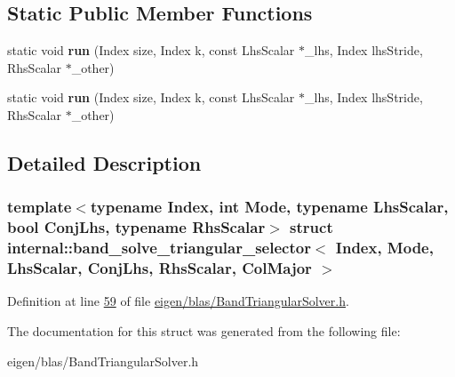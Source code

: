 \subsection*{Static Public Member Functions}
\begin{DoxyCompactItemize}
\item 
\mbox{\label{structinternal_1_1band__solve__triangular__selector_3_01_index_00_01_mode_00_01_lhs_scalar_00_0137de00cf99d429d0f5d51514cfce90a6_ae9359abe93b77be3fe9279c3d21919fe}} 
static void {\bfseries run} (Index size, Index k, const Lhs\+Scalar $\ast$\+\_\+lhs, Index lhs\+Stride, Rhs\+Scalar $\ast$\+\_\+other)
\item 
\mbox{\label{structinternal_1_1band__solve__triangular__selector_3_01_index_00_01_mode_00_01_lhs_scalar_00_0137de00cf99d429d0f5d51514cfce90a6_ae9359abe93b77be3fe9279c3d21919fe}} 
static void {\bfseries run} (Index size, Index k, const Lhs\+Scalar $\ast$\+\_\+lhs, Index lhs\+Stride, Rhs\+Scalar $\ast$\+\_\+other)
\end{DoxyCompactItemize}


\subsection{Detailed Description}
\subsubsection*{template$<$typename Index, int Mode, typename Lhs\+Scalar, bool Conj\+Lhs, typename Rhs\+Scalar$>$\newline
struct internal\+::band\+\_\+solve\+\_\+triangular\+\_\+selector$<$ Index, Mode, Lhs\+Scalar, Conj\+Lhs, Rhs\+Scalar, Col\+Major $>$}



Definition at line \hyperlink{eigen_2blas_2_band_triangular_solver_8h_source_l00059}{59} of file \hyperlink{eigen_2blas_2_band_triangular_solver_8h_source}{eigen/blas/\+Band\+Triangular\+Solver.\+h}.



The documentation for this struct was generated from the following file\+:\begin{DoxyCompactItemize}
\item 
eigen/blas/\+Band\+Triangular\+Solver.\+h\end{DoxyCompactItemize}
